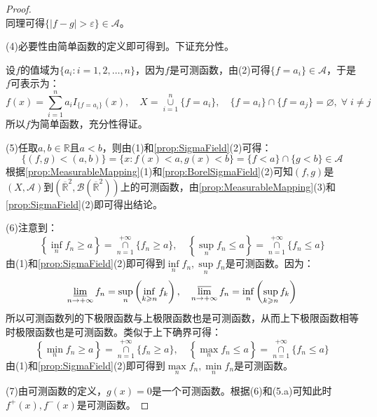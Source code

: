 \begin{proof}
\begin{equation*}
	\end{equation*}
	同理可得$\{|f-g|>\varepsilon\}\in\mathscr{A}$。\par
	(4)必要性由简单函数的定义即可得到。下证充分性。\par
	设$f$的值域为$\{a_i:i=1,2,\dots,n\}$，因为$f$是可测函数，由(2)可得$\{f=a_i\}\in\mathscr{A}$，于是$f$可表示为：
	\begin{equation*}
		f(x)=\sum_{i=1}^{n}a_iI_{\{f=a_i\}}(x),\quad X=\underset{i=1}{\overset{n}{\cup}}\{f=a_i\},\quad\{f=a_i\}\cap\{f=a_j\}=\varnothing,\;\forall\;i\ne j
	\end{equation*}
	所以$f$为简单函数，充分性得证。\par
	(5)任取$a,b\in\mathbb{R}$且$a<b$，则由(1)和\cref{prop:SigmaField}(2)可得：
	\begin{equation*}
		\{(f,g)<(a,b)\}=\{x:f(x)<a,g(x)<b\}=\{f<a\}\cap\{g<b\}\in\mathscr{A}
	\end{equation*}
	根据\cref{prop:MeasurableMapping}(1)和\cref{prop:BorelSigmaField}(2)可知$(f,g)$是$(X,\mathscr{A})$到$(\overline{\mathbb{R}}^{2},\mathcal{B}(\overline{\mathbb{R}}^{2}))$上的可测函数，由\cref{prop:MeasurableMapping}(3)和\cref{prop:SigmaField}(2)即可得出结论。\par
	(6)注意到：
	\begin{equation*}
		\left\{\inf_nf_n\geqslant a\right\}=\underset{n=1}{\overset{+\infty}{\cap}}\{f_n\geqslant a\},\quad\left\{\sup_nf_n\leqslant a\right\}=\underset{n=1}{\overset{+\infty}{\cap}}\{f_n\leqslant a\}
	\end{equation*}
	由(1)和\cref{prop:SigmaField}(2)即可得到$\inf\limits_nf_n,\sup\limits_nf_n$是可测函数。因为：
	\begin{equation*}
		\varliminf_{n\to+\infty}f_n=\sup_{n}\left(\inf_{k\geqslant n}f_k\right),\quad\varlimsup_{n\to+\infty}f_n=\inf_{n}\left(\sup_{k\geqslant n}f_k\right)
	\end{equation*}
	所以可测函数列的下极限函数与上极限函数也是可测函数，从而上下极限函数相等时极限函数也是可测函数。类似于上下确界可得：
	\begin{equation*}
		\left\{\min_nf_n\geqslant a\right\}=\underset{n=1}{\overset{+\infty}{\cap}}\{f_n\geqslant a\},\quad\left\{\max_nf_n\leqslant a\right\}=\underset{n=1}{\overset{+\infty}{\cap}}\{f_n\leqslant a\}
	\end{equation*}
	由(1)和\cref{prop:SigmaField}(2)即可得到$\max\limits_nf_n,\min\limits_nf_n$是可测函数。\par
	(7)由可测函数的定义，$g(x)=0$是一个可测函数。根据(6)和(5.a)可知此时$f^+(x),f^-(x)$是可测函数。\par

\end{proof}
